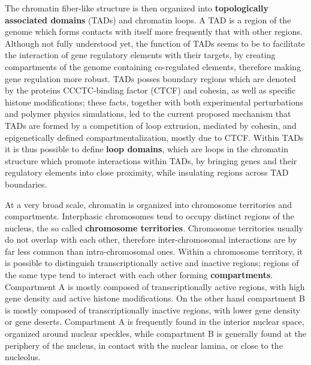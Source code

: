 
The chromatin fiber-like structure is then organized into \textbf{topologically associated domains} (TADs) and chromatin loops. A TAD is a region of the genome which forms contacts with itself more frequently that with other regions. Although not fully understood yet, the function of TADs seems to be to facilitate the interaction of gene regulatory elements with their targets, by creating compartments of the genome containing co-regulated elements, therefore making gene regulation more robust\cite{tadrole2018}. TADs posses boundary regions which are denoted by the proteins CCCTC-binding factor (CTCF) and cohesin, as well as specific histone modifications\cite{chromatindevelopment2019}; these facts, together with both experimental perturbations and polymer physics simulations, led to the current proposed mechanism that TADs are formed by a competition of loop extrusion, mediated by cohesin, and epigenetically defined compartmentalization, mostly due to CTCF\cite{tadformation2018}. Within TADs it is thus possible to define \textbf{loop domains}, which are loops in the chromatin structure which promote interactions within TADs, by bringing genes and their regulatory elements into close proximity, while insulating regions across TAD boundaries\cite{chromatindevelopment2019}. 

At a very broad scale, chromatin is organized into chromosome territories and compartments. Interphasic chromosomes tend to occupy distinct regions of the nucleus, the so called \textbf{chromosome territories}\cite{chromosometerritories2010}. Chromosome territories usually do not overlap with each other, therefore inter-chromosomal interactions are by far less common than intra-chromosomal ones. Within a chromosome territory, it is possible to distinguish transcriptionally active and inactive regions; regions of the same type tend to interact with each other forming \textbf{compartments}. Compartment A is mostly composed of transcriptionally active regions, with high gene density and active histone modifications. On the other hand compartment B is mostly composed of transcriptionally inactive regions, with lower gene density or gene deserts\cite{chromatindevelopment2019}. Compartment A is frequently found in the interior nuclear space, organized around nuclear speckles, while compartment B is generally found at the periphery of the nucleus, in contact with the nuclear lamina, or close to the nucleolus\cite{chromatinorganization2019, chromatindevelopment2019}.

